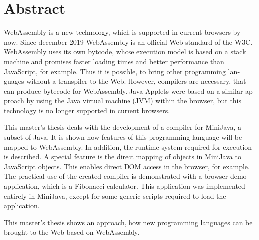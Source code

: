 \chapter{Abstract}


\begin{english}
WebAssembly is a new technology, which is supported in current browsers by now. Since december 2019 WebAssembly is an official Web standard of the W3C. Web\-As\-sem\-bly uses its own bytcode, whose execution model is based on a stack machine and promises faster loading times and better performance than JavaScript, for example. Thus it is possible, to bring other programming languages without a transpiler to the Web. However, compilers are necessary, that can produce bytecode for WebAssembly. Java Applets were based on a similar approach by using the Java virtual machine (JVM) within the browser, but this technology is no longer supported in current browsers.

This master's thesis deals with the development of a compiler for MiniJava, a subset of Java. It is shown how features of this programming language will be mapped to WebAssembly. In addition, the runtime system required for execution is described. A special feature is the direct mapping of objects in MiniJava to JavaScript objects. This enables direct DOM access in the browser, for example. The practical use of the created compiler is demonstrated with a browser demo application, which is a Fibonacci calculator. This application was implemented entirely in MiniJava, except for some generic scripts required to load the application.

This master's thesis shows an approach, how new programming languages can be brought to the Web based on WebAssembly.
\end{english}
